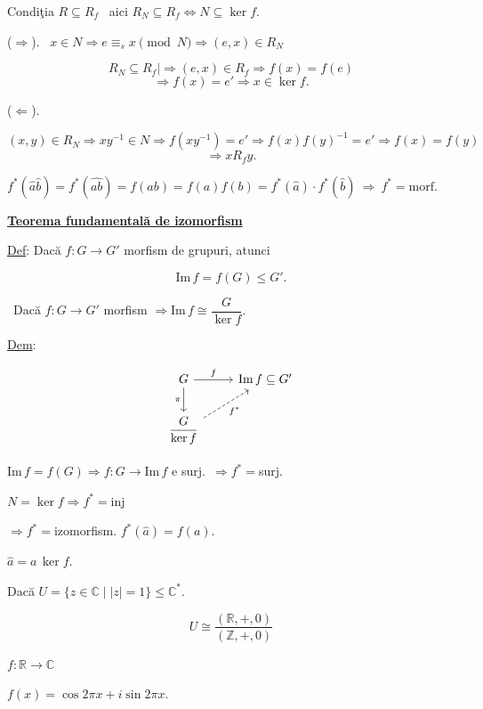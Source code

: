 \documentclass[12pt]{article}
\begin{document}
\noindent Condiţia $R\subseteq R_f$ \ aici $R_N\subseteq R_f \Leftrightarrow N\subseteq\ker f$.

\bigskip
\noindent ($\Rightarrow$). \ $x\in N \Rightarrow e\equiv_s x \pmod N \Rightarrow (e,x)\in R_N$

\[
R_N\subseteq R_f \Big| \Rightarrow (e,x)\in R_f \Rightarrow f(x)=f(e)
\]
\[
\Rightarrow f(x)=e' \Rightarrow x\in\ker f.
\]

\bigskip
\noindent ($\Leftarrow$).

\[
(x,y)\in R_N \Rightarrow xy^{-1}\in N \Rightarrow f(xy^{-1})=e' \Rightarrow f(x)f(y)^{-1}=e' \Rightarrow f(x)=f(y)
\]
\[
\Rightarrow xR_fy.
\]

\bigskip
\noindent $f^*(\hat a\hat b) = f^*(\widehat{ab}) = f(ab) = f(a)f(b) = f^*(\hat a)\cdot f^*(\hat b) \ \Rightarrow \ f^*=\text{morf.}$

\bigskip
\begin{center}
\underline{\textbf{Teorema fundamentală de izomorfism}}
\end{center}

\noindent\underline{Def}: Dacă $f:G\to G'$ morfism de grupuri, atunci

\[
\text{Im}\,f = f(G) \leq G'.
\]

\bigskip
\noindent{} \ Dacă $f:G\to G'$ morfism $\Rightarrow \text{Im}\,f \cong \dfrac{G}{\ker f}$.

\bigskip
\noindent\underline{Dem}:

\[
\begin{tikzcd}
G \arrow[r,"f"] \arrow[d,"\pi"'] & \text{Im}\,f \subseteq G' \\
\dfrac{G}{\ker f} \arrow[ur, dashed,"f^*"'] &
\end{tikzcd}
\]

\bigskip
\noindent $\text{Im}\,f=f(G) \Rightarrow f:G\to\text{Im}\,f$ e surj.\ $\Rightarrow f^*=$surj.

\noindent $N=\ker f \Rightarrow f^*=$inj

\noindent $\Rightarrow f^*=$izomorfism. \quad $f^*(\hat a) = f(a)$.

\noindent $\hat a = a\,\ker f$.

\bigskip
\noindent Dacă $U=\{z\in\mathbb{C} \mid |z|=1\} \leq \mathbb{C}^*$.

\[
U \cong \frac{(\mathbb{R},+,0)}{(\mathbb{Z},+,0)}
\]

\noindent $f:\mathbb{R}\to\mathbb{C}$

\noindent $f(x) = \cos 2\pi x + i\sin 2\pi x$.
\end{document}
